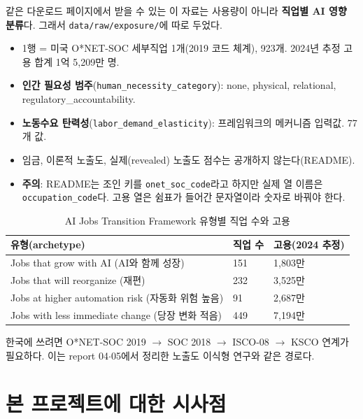 \documentclass[11pt]{article}
\begin{document}
같은 다운로드 페이지에서 받을 수 있는 이 자료\parencite{openai-2026-ai-jobs-transition-framework}는 사용량이 아니라 \textbf{직업별 AI 영향 분류}다. 그래서 \texttt{data/raw/exposure/}에 따로 두었다.

\begin{itemize}
  \item 1행 = 미국 O*NET-SOC 세부직업 1개(2019 코드 체계), 923개. 2024년 추정 고용 합계 1억 5,209만 명.
  \item \textbf{인간 필요성 범주}(\texttt{human\_necessity\_category}): none, physical, relational, regulatory\_accountability.
  \item \textbf{노동수요 탄력성}(\texttt{labor\_demand\_elasticity}): 프레임워크의 메커니즘 입력값. 77개 값.
  \item 임금, 이론적 노출도, 실제(revealed) 노출도 점수는 공개하지 않는다(README).
  \item \textbf{주의}: README는 조인 키를 \texttt{onet\_soc\_code}라고 하지만 실제 열 이름은 \texttt{occupation\_code}다. 고용 열은 쉼표가 들어간 문자열이라 숫자로 바꿔야 한다.
\end{itemize}

\begin{longtable}{L{8.0cm}L{2.8cm}L{3.4cm}}
\caption{AI Jobs Transition Framework 유형별 직업 수와 고용}\label{tab:ajtf}\\
\toprule
유형(archetype) & 직업 수 & 고용(2024 추정) \\
\midrule
\endhead
Jobs that grow with AI (AI와 함께 성장) & 151 & 1,803만 \\
Jobs that will reorganize (재편) & 232 & 3,525만 \\
Jobs at higher automation risk (자동화 위험 높음) & 91 & 2,687만 \\
Jobs with less immediate change (당장 변화 적음) & 449 & 7,194만 \\
\bottomrule
\end{longtable}

한국에 쓰려면 O*NET-SOC 2019 $\to$ SOC 2018 $\to$ ISCO-08 $\to$ KSCO 연계가 필요하다. 이는 report 04$\cdot$05에서 정리한 노출도 이식형 연구와 같은 경로다.

\section{본 프로젝트에 대한 시사점}
\end{document}
